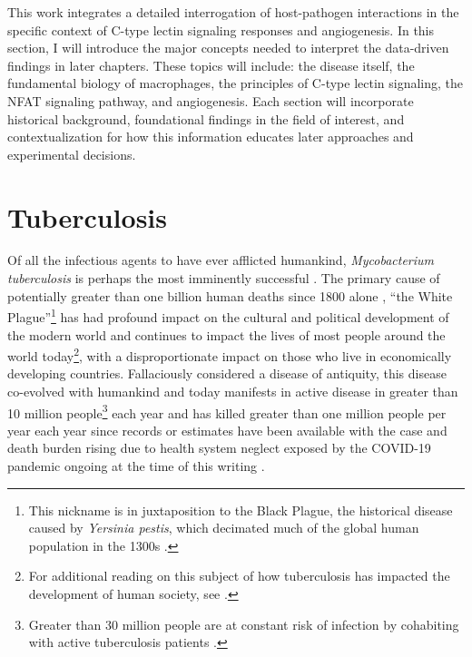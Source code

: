 This work integrates a detailed interrogation of host\hyp{}pathogen interactions in the specific context of C\hyp{}type lectin signaling responses and angiogenesis. In this section, I will introduce the major concepts needed to interpret the data\hyp{}driven findings in later chapters. These topics will include: the disease itself, the fundamental biology of macrophages, the principles of C\hyp{}type lectin signaling, the NFAT signaling pathway, and angiogenesis. Each section will incorporate historical background, foundational findings in the field of interest, and contextualization for how this information educates later approaches and experimental decisions.

\section{Tuberculosis}\label{tuberculosis}

Of all the infectious agents to have ever afflicted humankind, \textit{Mycobacterium tuberculosis} is perhaps the most imminently successful \citep{Barberis2017}. The primary cause of potentially greater than one billion human deaths since 1800 alone \citep{Paulson2013, Murray2004}, ``the White Plague''\footnote{This nickname is in juxtaposition to the Black Plague, the historical disease caused by \textit{Yersinia pestis}, which decimated much of the global human population in the 1300s \citep{Perry1997}.} has had profound impact on the cultural and political development of the modern world and continues to impact the lives of most people around the world today\footnote{For additional reading on this subject of how tuberculosis has impacted the development of human society, see \citep{Chalke1962, Dubos1987, Day2017}.}, with a disproportionate impact on those who live in economically developing countries. Fallaciously considered a disease of antiquity, this disease co\hyp{}evolved with humankind \citep{Hershkovitz2015} and today manifests in active disease in greater than 10 million people\footnote{Greater than 30 million people are at constant risk of infection by cohabiting with active tuberculosis patients \citep{Ross2021}.} each year and has killed greater than one million people per year each year since records or estimates have been available \citep{WHO2022, Saleem2013} with the case and death burden rising due to health system neglect exposed by the COVID\hyp{}19 pandemic ongoing at the time of this writing \citep{Pai2022}. 

